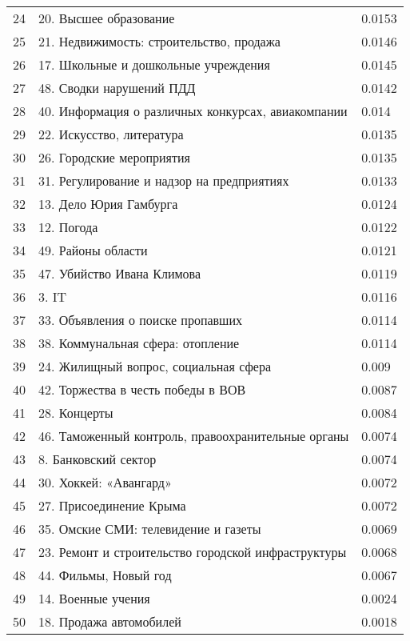 \begin{longtable}[c]{| L{3cm} | C{7cm} | R{5cm} |}
24 & 20. Высшее образование & 0.0153 \\
25 & 21. Недвижимость: строительство, продажа & 0.0146 \\
26 & 17. Школьные и дошкольные учреждения & 0.0145 \\
27 & 48. Сводки нарушений ПДД & 0.0142 \\
28 & 40. Информация о различных конкурсах, авиакомпании & 0.014 \\
29 & 22. Искусство, литература & 0.0135 \\
30 & 26. Городские мероприятия & 0.0135 \\
31 & 31. Регулирование и надзор на предприятиях & 0.0133 \\
32 & 13. Дело Юрия Гамбурга & 0.0124 \\
33 & 12. Погода & 0.0122 \\
34 & 49. Районы области & 0.0121 \\
35 & 47. Убийство Ивана Климова & 0.0119 \\
36 & 3. IT & 0.0116 \\
37 & 33. Объявления о поиске пропавших & 0.0114 \\
38 & 38. Коммунальная сфера: отопление & 0.0114 \\
39 & 24. Жилищный вопрос, социальная сфера & 0.009 \\
40 & 42. Торжества в честь победы в ВОВ & 0.0087 \\
41 & 28. Концерты & 0.0084 \\
42 & 46. Таможенный контроль, правоохранительные органы & 0.0074 \\
43 & 8. Банковский сектор & 0.0074 \\
44 & 30. Хоккей: «Авангард» & 0.0072 \\
45 & 27. Присоединение Крыма & 0.0072 \\
46 & 35. Омские СМИ: телевидение и газеты & 0.0069 \\
47 & 23. Ремонт и строительство городской инфраструктуры & 0.0068 \\
48 & 44. Фильмы, Новый год & 0.0067 \\
49 & 14. Военные учения & 0.0024 \\
50 & 18. Продажа автомобилей & 0.0018 \\
	\hline
\end{longtable}

